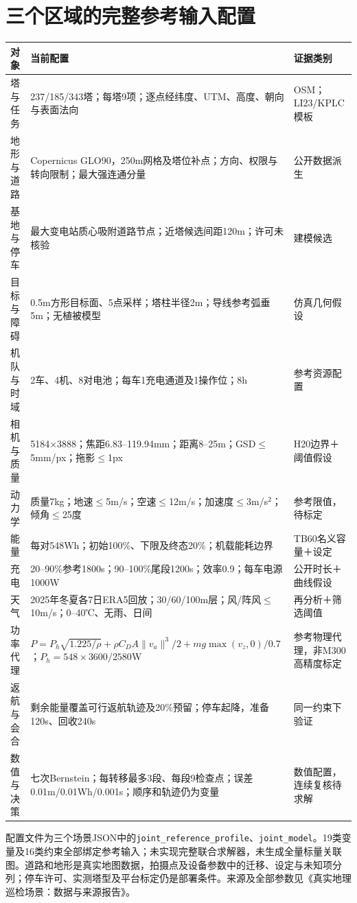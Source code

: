 \section{三个区域的完整参考输入配置}
\begin{center}\small
\begin{tabular}{p{.19\linewidth}p{.49\linewidth}p{.22\linewidth}}\toprule
对象 & 当前配置 & 证据类别\\\midrule
塔与任务 & 237/185/343塔；每塔9项；逐点经纬度、UTM、高度、朝向与表面法向 & OSM；LI23/KPLC模板\\
地形与道路 & Copernicus GLO90，250m网格及塔位补点；方向、权限与转向限制；最大强连通分量 & 公开数据派生\\
基地与停车 & 最大变电站质心吸附道路节点；近塔候选间距120m；许可未核验 & 建模候选\\
目标与障碍 & 0.5m方形目标面、5点采样；塔柱半径2m；导线参考弧垂5m；无植被模型 & 仿真几何假设\\
机队与时域 & 2车、4机、8对电池；每车1充电通道及1操作位；8h & 参考资源配置\\
相机与质量 & 5184×3888；焦距6.83--119.94mm；距离8--25m；GSD$\le$5mm/px；拖影$\le$1px & H20边界＋阈值假设\\
动力学 & 质量7kg；地速$\le$5m/s；空速$\le$12m/s；加速度$\le$3m/s$^2$；倾角$\le$25度 & 参考限值，待标定\\
能量 & 每对548Wh；初始100\%、下限及终态20\%；机载能耗边界 & TB60名义容量＋设定\\
充电 & 20--90\%参考1800s；90--100\%尾段1200s；效率0.9；每车电源1000W & 公开时长＋曲线假设\\
天气 & 2025年冬夏各7日ERA5回放；30/60/100m层；风/阵风$\le$10m/s；0--40℃、无雨、日间 & 再分析＋筛选阈值\\
功率代理 & $P=P_h\sqrt{1.225/\rho}+\rho C_DA\|v_a\|^3/2+mg\max(v_z,0)/0.7$；$P_h=548\times3600/2580$W & 参考物理代理，非M300高精度标定\\
返航与会合 & 剩余能量覆盖可行返航轨迹及20\%预留；停车起降，准备120s、回收240s & 同一约束下验证\\
数值与决策 & 七次Bernstein；每转移最多3段、每段9检查点；误差0.01m/0.01Wh/0.001s；顺序和轨迹仍为变量 & 数值配置，连续复核待求解\\\bottomrule
\end{tabular}
\end{center}
\noindent 配置文件为三个场景JSON中的\texttt{joint\_reference\_profile}、\texttt{joint\_model}。19类变量及16类约束全部绑定参考输入；未实现完整联合求解器，未生成全量标量关联图。道路和地形是真实地图数据，拍摄点及设备参数中的迁移、设定与未知项分列；停车许可、实测塔型及平台标定仍是部署条件。来源及全部参数见《真实地理巡检场景：数据与来源报告》。

